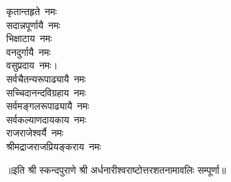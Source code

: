 \begin{multicols}{2}
\begin{flushleft}
कृतान्तहृते~नमः\\
सदान्नपूर्णायै~नमः\\
भिक्षाटाय~नमः\\
वनदुर्गायै~नमः\\
वसुप्रदाय~नमः।\hfill{}\\
सर्वचैतन्यरूपाढ्यायै~नमः\\
सच्चिदानन्दविग्रहाय~नमः\\
सर्वमङ्गलरूपाढ्यायै~नमः\\
सर्वकल्याणदायकाय~नमः\\
राजराजेश्वर्यै~नमः\\
श्रीमद्राजराजप्रियङ्कराय~नमः\\
\end{flushleft}
\end{multicols}
॥इति श्री स्कन्दपुराणे श्री अर्धनारीश्वराष्टोत्तरशतनामावलिः सम्पूर्णा॥